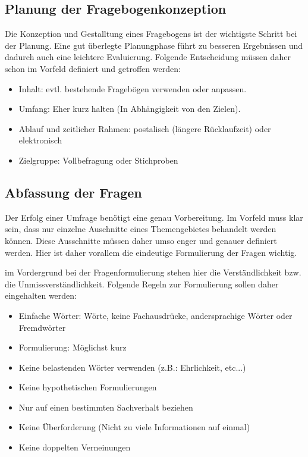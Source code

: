 \subsection{Planung der Fragebogenkonzeption}
Die Konzeption und Gestalltung eines Fragebogens ist der wichtigste Schritt bei der Planung.
Eine gut überlegte Planungphase führt zu besseren Ergebnissen und dadurch auch eine leichtere
Evaluierung. Folgende Entscheidung müssen daher schon im Vorfeld definiert und getroffen werden:
\begin{itemize}
    \item Inhalt: evtl. bestehende Fragebögen verwenden oder anpassen.
    \item Umfang: Eher kurz halten (In Abhängigkeit von den Zielen).
    \item Ablauf und zeitlicher Rahmen: postalisch (längere Rücklaufzeit) oder elektronisch
    \item Zielgruppe: Vollbefragung oder Stichproben
\end{itemize}

\subsection{Abfassung der Fragen}
Der Erfolg einer Umfrage benötigt eine genau Vorbereitung. Im Vorfeld muss klar sein,
dass nur einzelne Auschnitte eines Themengebietes behandelt werden können. Diese Ausschnitte
müssen daher umso enger und genauer definiert werden. Hier ist daher vorallem die eindeutige
Formulierung der Fragen wichtig.

im Vordergrund bei der Fragenformulierung stehen hier die Verständlichkeit bzw. die Unmissverständlichkeit.
Folgende Regeln zur Formulierung sollen daher eingehalten werden:
\begin{itemize}
    \item Einfache Wörter: Wörte, keine Fachausdrücke, andersprachige Wörter oder Fremdwörter
    \item Formulierung: Möglichst kurz
    \item Keine belastenden Wörter verwenden (z.B.: Ehrlichkeit, etc...)
    \item Keine hypothetischen Formulierungen
    \item Nur auf einen bestimmten Sachverhalt beziehen
    \item Keine Überforderung (Nicht zu viele Informationen auf einmal)
    \item Keine doppelten Verneinungen
\end{itemize}

